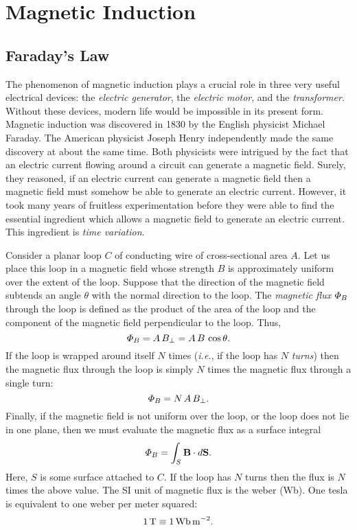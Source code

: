 \section{Magnetic Induction}
\subsection{Faraday's Law}
The phenomenon of magnetic induction plays a crucial role in 
three very useful electrical devices: the {\em electric generator}, the {\em electric
motor}, and the {\em transformer}. Without these devices, modern life would be
impossible in its present form. Magnetic induction was discovered in 1830 by the 
English physicist Michael Faraday.  The American physicist Joseph Henry
independently made the same discovery at about the same time. Both
physicists were intrigued by the fact that an electric current flowing around 
a circuit can generate a magnetic field. Surely, they reasoned, if an electric
current can generate  a magnetic field then a magnetic field must somehow be able to
generate an electric current.
However, it took many years of fruitless experimentation
before they were able to find the essential ingredient which allows
a magnetic field to generate an electric current. This
 ingredient is {\em time variation}.

Consider a planar loop $C$ of conducting wire of cross-sectional area $A$.
Let us place this loop in a magnetic field whose strength $B$ is approximately
uniform over the extent of the loop. Suppose that the direction of the
magnetic field subtends an angle $\theta$ with the normal direction to the
loop. The {\em magnetic flux}\/ ${\mit\Phi}_B$ through the loop is
defined as the product of the area of the loop and the component of
the magnetic field perpendicular to the loop. Thus,
\begin{equation}
{\mit\Phi}_B = A\,B_\perp= A\, B\, \cos\theta.
\end{equation}
If the loop is wrapped around itself $N$ times ({\em i.e.}, if the loop
has $N$ {\em turns}) then the magnetic flux through the loop is simply
$N$ times the magnetic flux through a single turn:
\begin{equation}
{\mit\Phi}_B = N\,A\,B_\perp.
\end{equation}
Finally, if the magnetic field is not uniform over the loop, or the loop does not
lie in one plane,
 then we must evaluate the
magnetic flux as a surface integral
\begin{equation}
{\mit\Phi}_B = \int_S {\bf B}\cdot d{\bf S}.
\end{equation}
Here, $S$ is some surface attached to $C$.
If the loop has $N$ turns then the flux is $N$ times the above value. 
The SI unit of magnetic flux is the weber (Wb). One tesla is equivalent to
one weber per meter squared:
\begin{equation}
1\,{\rm T} \equiv 1\,{\rm Wb\, m}^{-2}.
\end{equation}

